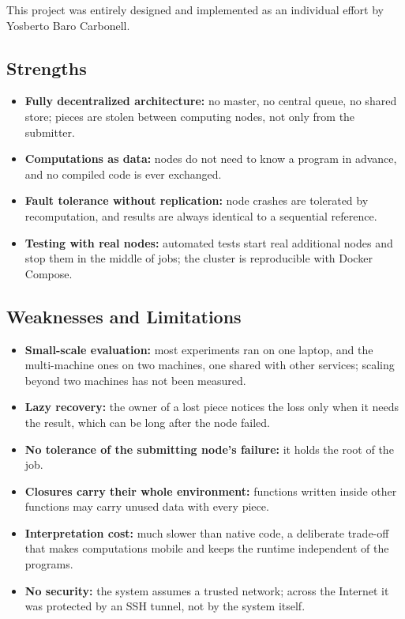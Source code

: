 \documentclass{scrartcl}
\begin{document}
This project was entirely designed and implemented as an individual effort by Yosberto Baro Carbonell.

\subsection{Strengths}

\begin{itemize}
  \item \textbf{Fully decentralized architecture:} no master, no central queue, no shared store; pieces are stolen between computing nodes, not only from the submitter.
  \item \textbf{Computations as data:} nodes do not need to know a program in advance, and no compiled code is ever exchanged.
  \item \textbf{Fault tolerance without replication:} node crashes are tolerated by recomputation, and results are always identical to a sequential reference.
  \item \textbf{Testing with real nodes:} automated tests start real additional nodes and stop them in the middle of jobs; the cluster is reproducible with Docker Compose.
\end{itemize}

\subsection{Weaknesses and Limitations}

\begin{itemize}
  \item \textbf{Small-scale evaluation:} most experiments ran on one laptop, and the multi-machine ones on two machines, one shared with other services; scaling beyond two machines has not been measured.
  \item \textbf{Lazy recovery:} the owner of a lost piece notices the loss only when it needs the result, which can be long after the node failed.
  \item \textbf{No tolerance of the submitting node's failure:} it holds the root of the job.
  \item \textbf{Closures carry their whole environment:} functions written inside other functions may carry unused data with every piece.
  \item \textbf{Interpretation cost:} much slower than native code, a deliberate trade-off that makes computations mobile and keeps the runtime independent of the programs.
  \item \textbf{No security:} the system assumes a trusted network; across the Internet it was protected by an SSH tunnel, not by the system itself.
\end{itemize}
\end{document}
